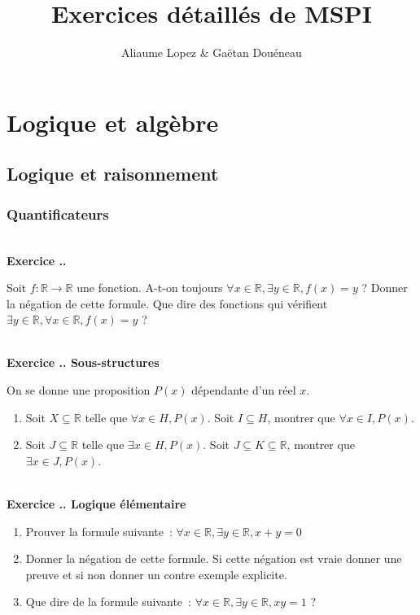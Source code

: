 \documentclass{article}
\newcommand{\mb}[1]{\mathbb{#1}}
\newcounter{exo}
\newcommand{\exercice}[1][\null]{\textbf{\\ Exercice \thesection.\theexo. #1} \addtocounter{exo}{1}}
\begin{document}
\title{Exercices détaillés de MSPI}

\author{Aliaume Lopez \& Gaëtan Douéneau}

\maketitle

\tableofcontents

\pagebreak


\section{Logique et algèbre}

\subsection{Logique et raisonnement}

\subsubsection{Quantificateurs}

\exercice 

Soit $f : \mb{R} \rightarrow \mb{R}$ une fonction. A-t-on toujours $\forall x \in \mb{R}, \exists y \in \mb{R}, f(x) = y$ ? Donner la négation de cette formule. Que dire des fonctions qui vérifient $\exists y \in \mb{R}, \forall x \in \mb{R},  f(x) = y$ ?

\exercice[Sous-structures]

On se donne une proposition $P(x)$ dépendante d'un réel $x$.

\begin{enumerate}

\item Soit $X \subseteq \mb{R}$ telle que $\forall x \in H, P(x)$. Soit $I \subseteq H$, montrer que $\forall x \in I, P(x)$.

\item Soit $J \subseteq \mb{R}$ telle que $\exists x \in H, P(x)$. Soit $J \subseteq K \subseteq \mb{R}$, montrer que $\exists x \in J, P(x)$.
\end{enumerate}

\exercice[Logique élémentaire]

\begin{enumerate}
    \item Prouver la formule suivante~: $\forall x \in \mathbb{R}, \exists y \in
        \mathbb{R}, x + y = 0$

    \item Donner la négation de cette formule. Si cette négation est vraie
        donner une preuve et si non donner un contre exemple explicite.

    \item Que dire de la formule suivante~: $\forall x \in \mathbb{R}, \exists y \in
        \mathbb{R}, xy = 1$ ?
\end{enumerate}
\end{document}
